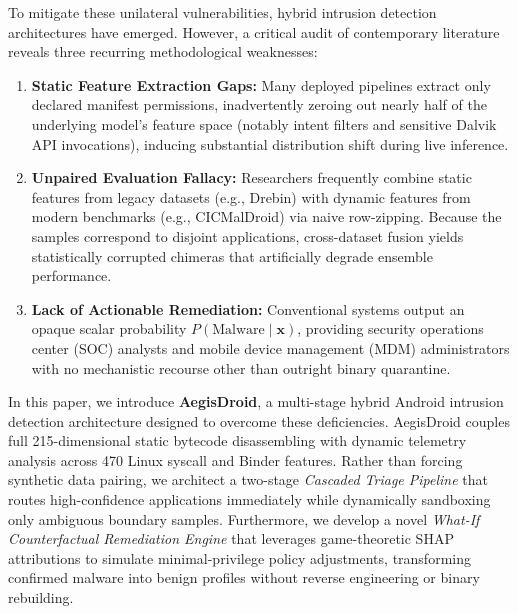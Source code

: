 \documentclass[10pt,journal,compsoc]{IEEEtran}
\begin{document}
To mitigate these unilateral vulnerabilities, hybrid intrusion detection architectures have emerged. However, a critical audit of contemporary literature reveals three recurring methodological weaknesses:
\begin{enumerate}
    \item \textbf{Static Feature Extraction Gaps:} Many deployed pipelines extract only declared manifest permissions, inadvertently zeroing out nearly half of the underlying model's feature space (notably intent filters and sensitive Dalvik API invocations), inducing substantial distribution shift during live inference.
    \item \textbf{Unpaired Evaluation Fallacy:} Researchers frequently combine static features from legacy datasets (e.g., Drebin) with dynamic features from modern benchmarks (e.g., CICMalDroid) via naive row-zipping. Because the samples correspond to disjoint applications, cross-dataset fusion yields statistically corrupted chimeras that artificially degrade ensemble performance.
    \item \textbf{Lack of Actionable Remediation:} Conventional systems output an opaque scalar probability $P(\text{Malware} \mid \mathbf{x})$, providing security operations center (SOC) analysts and mobile device management (MDM) administrators with no mechanistic recourse other than outright binary quarantine.
\end{enumerate}

In this paper, we introduce \textbf{AegisDroid}, a multi-stage hybrid Android intrusion detection architecture designed to overcome these deficiencies. AegisDroid couples full 215-dimensional static bytecode disassembling with dynamic telemetry analysis across 470 Linux syscall and Binder features. Rather than forcing synthetic data pairing, we architect a two-stage \textit{Cascaded Triage Pipeline} that routes high-confidence applications immediately while dynamically sandboxing only ambiguous boundary samples. Furthermore, we develop a novel \textit{What-If Counterfactual Remediation Engine} that leverages game-theoretic SHAP attributions to simulate minimal-privilege policy adjustments, transforming confirmed malware into benign profiles without reverse engineering or binary rebuilding.
\end{document}
